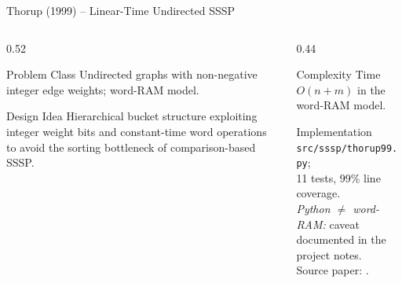 \documentclass[aspectratio=169]{beamer}
\begin{document}
\begin{frame}{Thorup (1999) -- Linear-Time Undirected SSSP}
  \begin{columns}[T]
    \begin{column}{0.52\textwidth}
      \begin{block}{Problem Class}
        Undirected graphs with non-negative integer edge weights; word-RAM model.
      \end{block}
      \begin{block}{Design Idea}
        Hierarchical bucket structure exploiting integer weight bits and constant-time word operations to avoid the sorting bottleneck of comparison-based SSSP.
      \end{block}
    \end{column}
    \begin{column}{0.44\textwidth}
      \begin{exampleblock}{Complexity}
        Time $O(n + m)$ in the word-RAM model.
      \end{exampleblock}
      \begin{alertblock}{Implementation}
        \texttt{src/sssp/thorup99.py};\\11 tests, 99\% line coverage.\\\emph{Python $\ne$ word-RAM:} caveat documented in the project notes.\\Source paper: \cite{thorup1999linear}.
      \end{alertblock}
    \end{column}
  \end{columns}
\end{frame}
\end{document}
